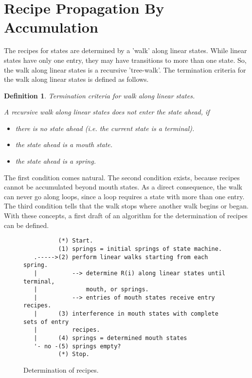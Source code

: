 \documentclass[12pt,a4paper]{scrartcl}
\newtheorem{definition}{Definition}
\begin{document}
%
\section{Recipe Propagation By Accumulation}

The recipes for states are determined by a 'walk' along linear states. While
linear states have only one entry, they may have transitions to more than one
state. So, the walk along linear states is a recursive 'tree-walk'. The
termination criteria for the walk along linear states is defined as follows.

\begin{definition}
Termination criteria for walk along linear states.

A recursive walk along linear states does not enter the
state ahead, if 

\begin{itemize}
    \item there is no state ahead (i.e. the current state is a terminal).
    \item the state ahead is a mouth state.
    \item the state ahead is a spring.
\end{itemize}
\end{definition}

The first condition comes natural. The second condition exists, because recipes
cannot be accumulated beyond mouth states. As a direct consequence, the walk
can never go along loops, since a loop requires a state with more than one
entry. The third condition tells that the walk stops where another walk begins
or began.  With these concepts, a first draft of an algorithm for the
determination of recipes can be defined.

\begin{figure}[htbp] \leavevmode
\begin{verbatim}
          (*) Start.
          (1) springs = initial springs of state machine.
   .----->(2) perform linear walks starting from each spring.
   |          --> determine R(i) along linear states until terminal,
   |              mouth, or springs.
   |          --> entries of mouth states receive entry recipes.
   |      (3) interference in mouth states with complete sets of entry
   |          recipes.
   |      (4) springs = determined mouth states
   '- no -(5) springs empty?
          (*) Stop.
\end{verbatim}

\caption{Determination of recipes.}
\end{figure}
\end{document}
